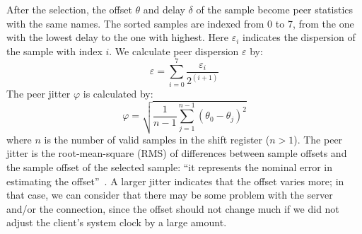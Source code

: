 After the selection, the offset $\theta$ and delay $\delta$ of the sample
become peer statistics with the same names. The sorted samples are indexed from
0 to 7, from the one with the lowest delay to the one with highest. Here
$\varepsilon_i$ indicates the dispersion of the sample with index $i$. We
calculate peer dispersion $\varepsilon$ by:
\begin{equation}
    \varepsilon = \sum^{7}_{i=0} \frac{\varepsilon_i}{2^{(i+1)}}
    \label{eq:peer_dispersion}
\end{equation}
The peer jitter $\varphi$ is calculated by:
\begin{equation}
    \varphi = \sqrt{\frac{1}{n-1} \sum^{n-1}_{j=1} (\theta_0 - \theta_j)^2}
    \label{eq:peer_jitter}
\end{equation}
where $n$ is the number of valid samples in the shift register ($n > 1$).
The peer jitter is the root-mean-square (RMS) of differences between sample
offsets and the sample offset of the selected sample: ``it represents the
nominal error in estimating the offset''~\cite{rfc5905}. A larger jitter
indicates that the offset varies more; in that case, we can consider that there
may be some problem with the server and/or the connection, since the offset
should not change much if we did not adjust the client's system clock by a
large amount.

